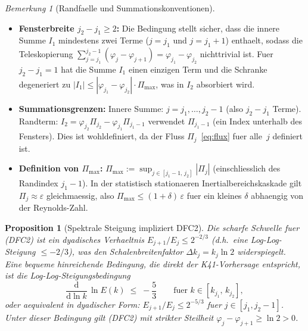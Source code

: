 \documentclass[12pt,a4paper]{article}
\theoremstyle{definition}
\theoremstyle{plain}
\newtheorem{proposition}[definition]{Proposition}
\theoremstyle{remark}
\newtheorem{remark}[definition]{Bemerkung}
\begin{document}
\begin{remark}[Randfaelle und Summationskonventionen]
\label{rem:edge-cases}
\mbox{}
\begin{itemize}
  \item \textbf{Fensterbreite $j_2 - j_1 \ge 2$:}\;
    Die Bedingung stellt sicher, dass die innere Summe $I_1$ mindestens
    zwei Terme ($j = j_1$ und $j = j_1+1$) enthaelt, sodass die
    Teleskopierung $\sum_{j=j_1}^{j_2-1}(\varphi_j - \varphi_{j+1}) =
    \varphi_{j_1} - \varphi_{j_2}$ nichttrivial ist. Fuer $j_2 - j_1 = 1$
    hat die Summe $I_1$ einen einzigen Term und die Schranke degeneriert zu
    $|I_1| \le |\varphi_{j_1}-\varphi_{j_2}|\cdot\Pi_{\max}$, was in
    $I_2$ absorbiert wird.
  \item \textbf{Summationsgrenzen:}\;
    Innere Summe: $j = j_1, \ldots, j_2-1$ (also $j_2-j_1$ Terme).
    Randterm: $I_2 = \varphi_{j_2}\Pi_{j_2} -
    \varphi_{j_1}\Pi_{j_1-1}$ verwendet $\Pi_{j_1-1}$ (ein Index
    unterhalb des Fensters). Dies ist wohldefiniert, da der Fluss
    $\Pi_j$~\eqref{eq:flux} fuer alle~$j$ definiert ist.
  \item \textbf{Definition von $\Pi_{\max}$:}\;
    $\Pi_{\max} := \sup_{j \in [j_1-1,\, j_2]} |\Pi_j|$ (einschliesslich
    des Randindex $j_1-1$). In der statistisch stationaeren
    Inertialbereichskaskade gilt $\Pi_j \approx \varepsilon$ gleichmaessig,
    also $\Pi_{\max} \le (1+\delta)\,\varepsilon$ fuer ein kleines $\delta$
    abhaengig von der Reynolds-Zahl.
\end{itemize}
\end{remark}

\begin{proposition}[Spektrale Steigung impliziert DFC2]\label{prop:slope-DFC2}
Die scharfe Schwelle fuer \textup{(DFC2)} ist ein dyadisches Verhaeltnis
$E_{j+1}/E_j \le 2^{-2/3}$ (d.h.\ eine Log-Log-Steigung $\le -2/3$),
was den Schalenbreitenfaktor $\Delta k_j = k_j \ln 2$ widerspiegelt.
Eine bequeme \emph{hinreichende} Bedingung, die direkt der
K41-Vorhersage entspricht, ist die \emph{Log-Log-Steigungsbedingung}
\begin{equation}\label{eq:slope-condition}
  \frac{\mathrm{d}}{\mathrm{d}\ln k}\,\ln E(k)
  \;\le\; -\frac{5}{3}
  \qquad \text{fuer } k \in [k_{j_1},\, k_{j_2}],
\end{equation}
oder aequivalent in dyadischer Form: $E_{j+1}/E_j \le 2^{-5/3}$ fuer
$j \in [j_1, j_2-1]$. Unter dieser Bedingung gilt \textup{(DFC2)}
mit strikter Steilheit $\varphi_j - \varphi_{j+1} \ge \ln 2 > 0$.
\end{proposition}
\end{document}
